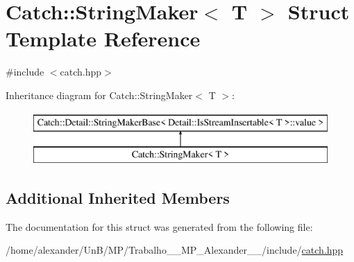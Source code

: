 \hypertarget{structCatch_1_1StringMaker}{\section{Catch\-:\-:String\-Maker$<$ T $>$ Struct Template Reference}
\label{structCatch_1_1StringMaker}
}


{\ttfamily \#include $<$catch.\-hpp$>$}

Inheritance diagram for Catch\-:\-:String\-Maker$<$ T $>$\-:\begin{figure}[H]
\begin{center}
\leavevmode
\includegraphics[height=2.000000cm]{structCatch_1_1StringMaker}
\end{center}
\end{figure}
\subsection*{Additional Inherited Members}


The documentation for this struct was generated from the following file\-:\begin{DoxyCompactItemize}
\item 
/home/alexander/\-Un\-B/\-M\-P/\-Trabalho\-\_\-\_\-\-M\-P\-\_\-\-Alexander\-\_\-\_/include/\hyperlink{catch_8hpp}{catch.\-hpp}\end{DoxyCompactItemize}
